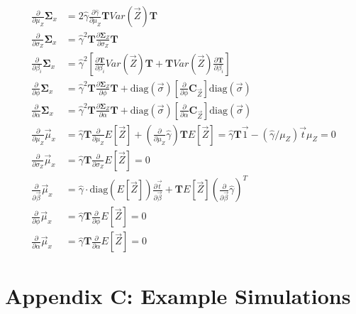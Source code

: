 {\begin{align*}
\frac{\partial}{\partial \mu_Z} \mathbf{\Sigma}_x &= 2 \hat{\gamma} \frac{\partial \hat{\gamma}}{\partial \mu_Z} \mathbf{T} Var\left(\vec{Z}\right) \mathbf{T} \\
\frac{\partial}{\partial \sigma_Z} \mathbf{\Sigma}_x &= \hat{\gamma}^2 \mathbf{T} \frac{\partial \mathbf{\Sigma}_Z}{\partial \sigma_Z} \mathbf{T} \\
\frac{\partial}{\partial \beta_i} \mathbf{\Sigma}_x &= \hat{\gamma}^2 \left[ \frac{\partial \mathbf{T}}{\partial \beta_i} Var(\vec{Z}) \mathbf{T} + \mathbf{T} Var(\vec{Z}) \frac{\partial \mathbf{T}}{\partial \beta_i} \right] \\
\frac{\partial}{\partial \phi} \mathbf{\Sigma}_x &= \hat{\gamma}^2 \mathbf{T} \frac{\partial \mathbf{\Sigma}_Z}{\partial \phi} \mathbf{T}  + \text{diag}(\vec{\sigma })\left  [\frac{\partial}{\partial \phi } \mathbf{C}_{\vec{Z}}\right ] \text{diag}(\vec{\sigma }) \\
\frac{\partial}{\partial \alpha } \mathbf{\Sigma}_x &= \hat{\gamma}^2 \mathbf{T} \frac{\partial \mathbf{\Sigma}_Z}{\partial \alpha } \mathbf{T}  + \text{diag}(\vec{\sigma })\left  [\frac{\partial}{\partial \alpha } \mathbf{C}_{\vec{Z}}\right ] \text{diag}(\vec{\sigma }) \\
\frac{\partial}{\partial \mu_Z} \vec{\mu}_x &= \hat{\gamma} \mathbf{T} \frac{\partial}{\partial \mu_Z} E\left[ \vec{Z} \right] + \left( \frac{\partial}{\partial \mu_Z} \hat{\gamma} \right) \mathbf{T} E\left[ \vec{Z} \right] = \hat{\gamma} \mathbf{T} \vec{1} - (\hat{\gamma}/\mu_Z) \vec{t} \mu_Z = 0 \\
\frac{\partial}{\partial \sigma_Z} \vec{\mu}_x &= \hat{\gamma} \mathbf{T} \frac{\partial}{\partial \sigma_Z} E\left[ \vec{Z} \right] = 0 \\
\frac{\partial}{\partial \vec{\beta}} \vec{\mu}_x &= \hat{\gamma} \cdot \text{diag}\left(E\left[ \vec{Z} \right]\right) \frac{\partial \vec{t}}{\partial \vec{\beta}} +  \mathbf{T} E\left[ \vec{Z} \right] \left(\frac{\partial}{\partial \vec{\beta}} \hat{\gamma} \right)^T \\
\frac{\partial}{\partial \phi} \vec{\mu}_x &= \hat{\gamma} \mathbf{T} \frac{\partial}{\partial \phi} E\left[ \vec{Z} \right] = 0 \\
\frac{\partial}{\partial \alpha} \vec{\mu}_x &= \hat{\gamma} \mathbf{T} \frac{\partial}{\partial \alpha } E\left[ \vec{Z} \right] = 0
\end{align*}

\section*{Appendix C: Example Simulations}
\FloatBarrier

}
